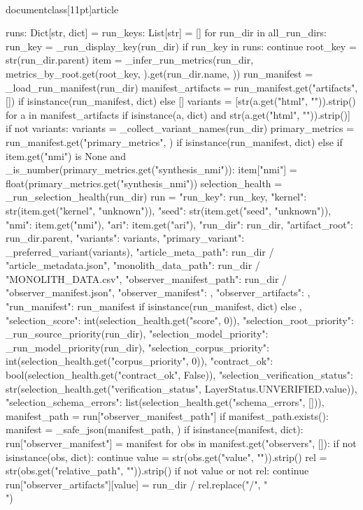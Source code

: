 \\documentclass[11pt]{article}
\begin{document}
\begin{CodeBlock}
{    runs: Dict[str, dict] = {}
    run_keys: List[str] = []
    for run_dir in all_run_dirs:
        run_key = _run_display_key(run_dir)
        if run_key in runs:
            continue
        root_key = str(run_dir.parent)
        item = _infer_run_metrics(run_dir, metrics_by_root.get(root_key, {}).get(run_dir.name, {}))
        run_manifest = _load_run_manifest(run_dir)
        manifest_artifacts = run_manifest.get("artifacts", []) if isinstance(run_manifest, dict) else []
        variants = [str(a.get("html", "")).strip() for a in manifest_artifacts if isinstance(a, dict) and str(a.get("html", "")).strip()]
        if not variants:
            variants = _collect_variant_names(run_dir)
        primary_metrics = run_manifest.get("primary_metrics", {}) if isinstance(run_manifest, dict) else {}
        if item.get("nmi") is None and _is_number(primary_metrics.get("synthesis_nmi")):
            item["nmi"] = float(primary_metrics.get("synthesis_nmi"))
        selection_health = _run_selection_health(run_dir)
        run = {
            "run_key": run_key,
            "kernel": str(item.get("kernel", "unknown")),
            "seed": str(item.get("seed", "unknown")),
            "nmi": item.get("nmi"),
            "ari": item.get("ari"),
            "run_dir": run_dir,
            "artifact_root": run_dir.parent,
            "variants": variants,
            "primary_variant": _preferred_variant(variants),
            "article_meta_path": run_dir / "article_metadata.json",
            "monolith_data_path": run_dir / "MONOLITH_DATA.csv",
            "observer_manifest_path": run_dir / "observer_manifest.json",
            "observer_manifest": {},
            "observer_artifacts": {},
            "run_manifest": run_manifest if isinstance(run_manifest, dict) else {},
            "selection_score": int(selection_health.get("score", 0)),
            "selection_root_priority": _run_source_priority(run_dir),
            "selection_model_priority": _run_model_priority(run_dir),
            "selection_corpus_priority": int(selection_health.get("corpus_priority", 0)),
            "contract_ok": bool(selection_health.get("contract_ok", False)),
            "selection_verification_status": str(selection_health.get("verification_status", LayerStatus.UNVERIFIED.value)),
            "selection_schema_errors": list(selection_health.get("schema_errors", [])),
        }
        manifest_path = run["observer_manifest_path"]
        if manifest_path.exists():
            manifest = _safe_json(manifest_path, {})
            if isinstance(manifest, dict):
                run["observer_manifest"] = manifest
                for obs in manifest.get("observers", []):
                    if not isinstance(obs, dict):
                        continue
                    value = str(obs.get("value", "")).strip()
                    rel = str(obs.get("relative_path", "")).strip()
                    if not value or not rel:
                        continue
                    run["observer_artifacts"][value] = run_dir / rel.replace("/", "\\")

}
\end{CodeBlock}
\end{document}
